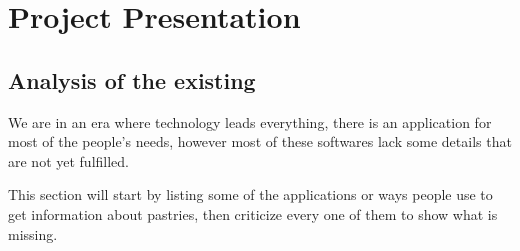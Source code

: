 \documentclass[12pt,a4paper]{report}
\begin{document}
	\section{Project Presentation}	
	
	\subsection{Analysis of the existing}
	We are in an era where technology leads everything, there is an application for most of the people's needs, however most of these softwares lack some details that are not yet fulfilled.\par
	This section will start by listing some of the applications or ways people use to get information about pastries, then criticize every one of them to show what is missing.
	
\end{document}
